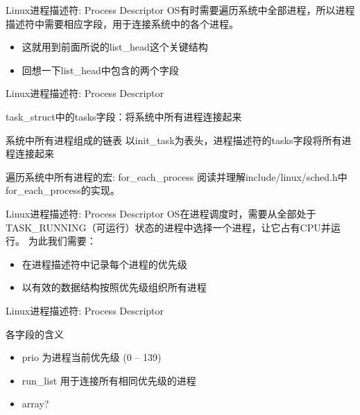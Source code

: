 \documentclass[xcolor=svgnames]{beamer}
\begin{document}
\begin{CJK*}{UTF8}{gbsn}

\begin{frame}{Linux进程描述符: Process Descriptor}
OS有时需要遍历系统中全部进程，所以进程描述符中需要相应字段，用于连接系统中的各个进程。
\begin{itemize}
\item 这就用到前面所说的list\_head这个关键结构
\item 回想一下list\_head中包含的两个字段
\end{itemize}
\end{frame}

\begin{frame}{Linux进程描述符: Process Descriptor}
\begin{block}{task\_struct中的tasks字段：将系统中所有进程连接起来} 
\lsttasks
\end{block}
\begin{block}{系统中所有进程组成的链表}
以init\_task为表头，进程描述符的tasks字段将所有进程连接起来
\end{block}
\begin{block}{遍历系统中所有进程的宏: for\_each\_process}
阅读并理解include/linux/sched.h中for\_each\_process的实现。
\end{block}
\end{frame}

\begin{frame}{Linux进程描述符: Process Descriptor}
OS在进程调度时，需要从全部处于TASK\_RUNNING（可运行）状态的进程中选择一个进程，让它占有CPU并运行。
为此我们需要：
\begin{itemize}
\item 在进程描述符中记录每个进程的优先级
\item 以有效的数据结构按照优先级组织所有进程
\end{itemize}
\end{frame}

\begin{frame}{Linux进程描述符: Process Descriptor}
\lstrunning
\begin{block}{各字段的含义}
\begin{itemize}
\item prio 为进程当前优先级 (0 -- 139)
\item run\_list 用于连接所有相同优先级的进程
\item array?
\end{itemize}
\end{block}
\end{frame}


\end{CJK*}
\end{document}
